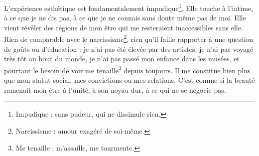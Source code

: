 {L’expérience esthétique est fondamentalement impudique\footnote{Impudique : sans pudeur, qui ne dissimule rien.}. Elle touche à l’intime, à ce que je ne dis pas, à ce que je ne connais sans doute même pas de moi. Elle vient révéler des régions de mon être qui me resteraient inaccessibles sans elle. Rien de comparable avec le narcissisme\footnote{Narcissisme : amour exagéré de soi-même.}, rien qu’il faille rapporter à une question de goûts ou d’éducation : je n’ai pas été élevée par des artistes, je n’ai pas voyagé très tôt au bout du monde, je n’ai pas passé mon enfance dans les musées, et pourtant le besoin de voir me tenaille\footnote{Me tenaille : m’assaille, me tourmente.} depuis toujours. Il me constitue bien plus que mon statut social, mes convictions ou mes relations. C’est comme si la beauté ramenait mon être à l’unité, à son noyau dur, à ce qui ne se négocie pas.
}


